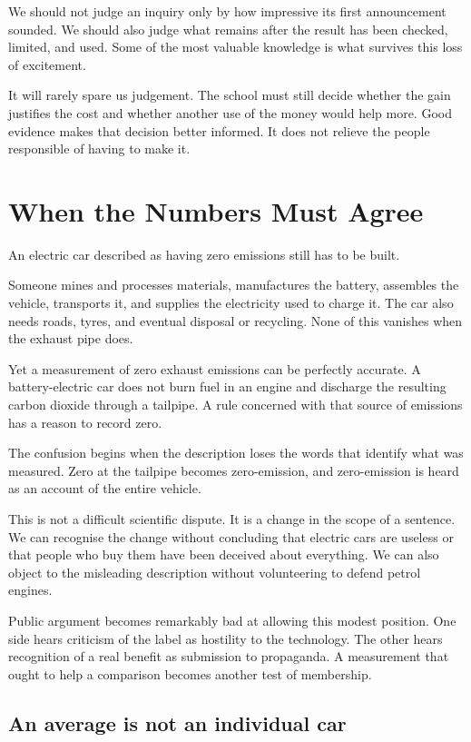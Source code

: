 \documentclass[12pt,a4paper]{book}
\begin{document}
We should not judge an inquiry only by how impressive its first announcement sounded. We should also judge what remains after the result has been checked, limited, and used. Some of the most valuable knowledge is what survives this loss of excitement.

It will rarely spare us judgement. The school must still decide whether the gain justifies the cost and whether another use of the money would help more. Good evidence makes that decision better informed. It does not relieve the people responsible of having to make it.

\chapter{When the Numbers Must Agree}

An electric car described as having zero emissions still has to be built.

Someone mines and processes materials, manufactures the battery, assembles the vehicle, transports it, and supplies the electricity used to charge it. The car also needs roads, tyres, and eventual disposal or recycling. None of this vanishes when the exhaust pipe does.

Yet a measurement of zero exhaust emissions can be perfectly accurate. A battery-electric car does not burn fuel in an engine and discharge the resulting carbon dioxide through a tailpipe. A rule concerned with that source of emissions has a reason to record zero.

The confusion begins when the description loses the words that identify what was measured. Zero at the tailpipe becomes zero-emission, and zero-emission is heard as an account of the entire vehicle.

This is not a difficult scientific dispute. It is a change in the scope of a sentence. We can recognise the change without concluding that electric cars are useless or that people who buy them have been deceived about everything. We can also object to the misleading description without volunteering to defend petrol engines.

Public argument becomes remarkably bad at allowing this modest position. One side hears criticism of the label as hostility to the technology. The other hears recognition of a real benefit as submission to propaganda. A measurement that ought to help a comparison becomes another test of membership.

\section*{An average is not an individual car}
\end{document}
